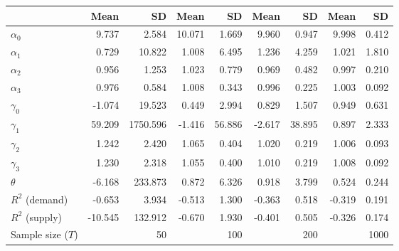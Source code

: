 
\begin{tabular}[t]{lrrrrrrrr}
\toprule
  & Mean & SD & Mean  & SD  & Mean   & SD   & Mean    & SD   \\
\midrule
$\alpha_{0}$ & 9.737 & 2.584 & 10.071 & 1.669 & 9.960 & 0.947 & 9.998 & 0.412\\
$\alpha_{1}$ & 0.729 & 10.822 & 1.008 & 6.495 & 1.236 & 4.259 & 1.021 & 1.810\\
$\alpha_{2}$ & 0.956 & 1.253 & 1.023 & 0.779 & 0.969 & 0.482 & 0.997 & 0.210\\
$\alpha_{3}$ & 0.976 & 0.584 & 1.008 & 0.343 & 0.996 & 0.225 & 1.003 & 0.092\\
$\gamma_{0}$ & -1.074 & 19.523 & 0.449 & 2.994 & 0.829 & 1.507 & 0.949 & 0.631\\
$\gamma_{1}$ & 59.209 & 1750.596 & -1.416 & 56.886 & -2.617 & 38.895 & 0.897 & 2.333\\
$\gamma_{2}$ & 1.242 & 2.420 & 1.065 & 0.404 & 1.020 & 0.219 & 1.006 & 0.093\\
$\gamma_{3}$ & 1.230 & 2.318 & 1.055 & 0.400 & 1.010 & 0.219 & 1.008 & 0.092\\
$\theta$ & -6.168 & 233.873 & 0.872 & 6.326 & 0.918 & 3.799 & 0.524 & 0.244\\
$R^{2}$ (demand) & -0.653 & 3.934 & -0.513 & 1.300 & -0.363 & 0.518 & -0.319 & 0.191\\
$R^{2}$ (supply) & -10.545 & 132.912 & -0.670 & 1.930 & -0.401 & 0.505 & -0.326 & 0.174\\
Sample size ($T$) &  & 50 &  & 100 &  & 200 &  & 1000\\
\bottomrule
\end{tabular}

